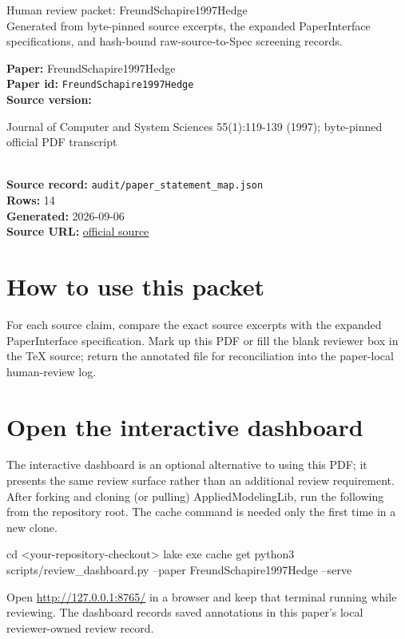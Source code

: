 \documentclass[10pt]{article}
\begin{document}
\fontsize{9}{10}\selectfont

\begin{center}
{\LARGE Human review packet: FreundSchapire1997Hedge}\\[0.35em]
\small Generated from byte-pinned source excerpts, the expanded PaperInterface
specifications, and hash-bound raw-source-to-Spec screening records.
\end{center}

\noindent\textbf{Paper:} FreundSchapire1997Hedge\\
\textbf{Paper id:} \texttt{FreundSchapire1997Hedge}\\
\textbf{Source version:} \parbox[t]{0.76\linewidth}{\raggedright Journal of Computer and System Sciences 55(1):119-139 (1997); byte-pinned official PDF transcript}\\
\textbf{Source record:} \texttt{audit/paper\_statement\_map.json}\\
\textbf{Rows:} 14\\
\textbf{Generated:} 2026-09-06\\
\textbf{Source URL:} \href{https://doi.org/10.1006/jcss.1997.1504}{official source}





\section*{How to use this packet}
For each source claim, compare the exact source excerpts with the expanded
PaperInterface specification. Mark up this PDF or fill the blank reviewer box in the TeX source;
return the annotated file for reconciliation into the paper-local human-review
log.

\section*{Open the interactive dashboard}
The interactive dashboard is an optional alternative to using this PDF; it
presents the same review surface rather than an additional review requirement.
After forking and cloning (or pulling) AppliedModelingLib, run the following from the
repository root. The cache command is needed only the first time in a new clone.
\begin{ReviewVerbatim}
cd <your-repository-checkout>
lake exe cache get
python3 scripts/review_dashboard.py --paper FreundSchapire1997Hedge --serve
\end{ReviewVerbatim}
Open \url{http://127.0.0.1:8765/} in a browser and keep that terminal running
while reviewing. The dashboard records saved annotations in this paper's local
reviewer-owned review record.
\end{document}
